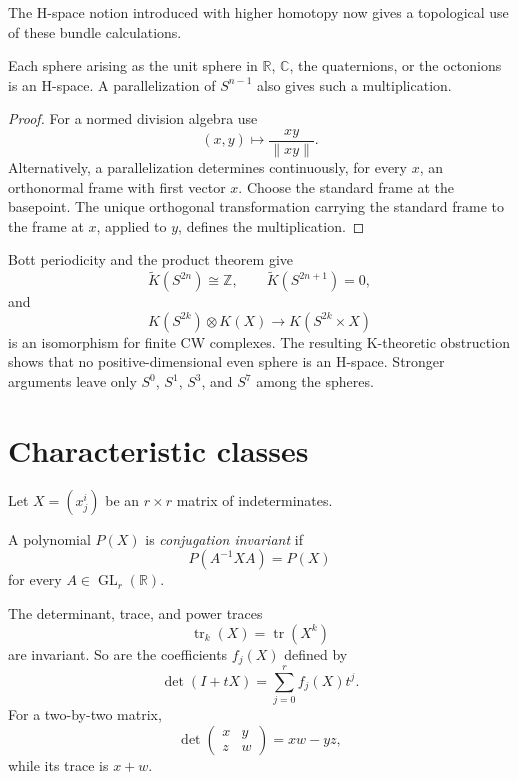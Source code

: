 The H-space notion introduced with higher
homotopy now gives a topological use of
these bundle calculations.

\begin{proposition}
\label{at-proposition-parallelizable-h-space}
Each sphere arising as the unit sphere in
$\mathbb{R}$, $\mathbb{C}$, the quaternions,
or the octonions is an H-space.  A
parallelization of $S^{n-1}$ also gives such
a multiplication.
\end{proposition}

\begin{proof}
For a normed division algebra use
$$
(x,y)\longmapsto\frac{xy}{\lVert xy\rVert}.
$$
Alternatively, a parallelization determines
continuously, for every $x$, an orthonormal
frame with first vector $x$.  Choose the
standard frame at the basepoint.  The unique
orthogonal transformation carrying the
standard frame to the frame at $x$, applied
to $y$, defines the multiplication.
\end{proof}

\begin{remark}
\label{at-remark-k-theory-h-spaces}
Bott periodicity and the product theorem give
$$
\widetilde K(S^{2n})\cong\mathbb{Z},
\qquad
\widetilde K(S^{2n+1})=0,
$$
and
$$
K(S^{2k})\otimes K(X)
\longrightarrow K(S^{2k}\times X)
$$
is an isomorphism for finite CW complexes.
The resulting K-theoretic obstruction shows
that no positive-dimensional even sphere is
an H-space.  Stronger arguments leave only
$S^0$, $S^1$, $S^3$, and $S^7$ among the
spheres.
\end{remark}
\section{Characteristic classes}
\label{section-characteristic-classes}

Let $X=(x^i_j)$ be an $r\times r$ matrix of
indeterminates.

\begin{definition}
\label{at-definition-invariant-polynomial}
A polynomial $P(X)$ is
\emph{conjugation invariant} if
$$
P(A^{-1}XA)=P(X)
$$
for every
$A\in\operatorname{GL}_r(\mathbb{R})$.
\end{definition}

\begin{example}
\label{at-example-invariant-polynomials}
The determinant, trace, and power traces
$$
\operatorname{tr}_k(X)=
\operatorname{tr}(X^k)
$$
are invariant.  So are the coefficients
$f_j(X)$ defined by
$$
\det(I+tX)=\sum_{j=0}^{r}f_j(X)t^j.
$$
For a two-by-two matrix,
$$
\det
\begin{pmatrix}x&y\\z&w\end{pmatrix}
=xw-yz,
$$
while its trace is $x+w$.
\end{example}

